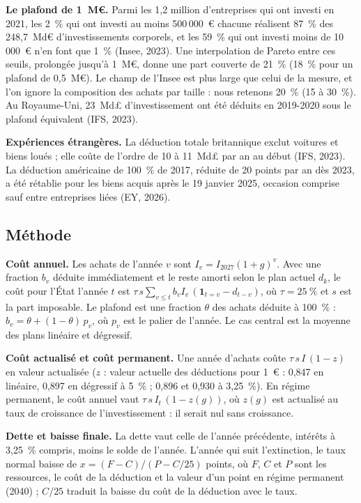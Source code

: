 
\textbf{Le plafond de 1~M€.} Parmi les 1,2 million d'entreprises qui ont investi en 2021, les 2~\% qui ont investi au
moins 500\,000~€ chacune réalisent 87~\% des 248,7~Md€ d'investissements corporels, et les 59~\% qui ont investi moins
de 10\,000~€ n'en font que 1~\% (Insee, 2023). Une interpolation de Pareto entre ces seuils, prolongée jusqu'à 1~M€,
donne une part couverte de 21~\% (18~\% pour un plafond de 0,5~M€). Le champ de l'Insee est plus large que celui de la
mesure, et l'on ignore la composition des achats par taille : nous retenons 20~\% (15 à 30~\%). Au
Royaume-Uni, 23~Md£ d'investissement ont été déduits en 2019-2020 sous le plafond équivalent (IFS, 2023).

\textbf{Expériences étrangères.} La déduction totale britannique exclut voitures et biens loués ; elle coûte de
l'ordre de 10 à 11~Md£ par an au début (IFS, 2023). La déduction américaine de 100~\% de 2017, réduite de
20 points par an dès 2023, a été rétablie pour les biens acquis après le 19 janvier 2025, occasion comprise sauf entre
entreprises liées (EY, 2026).

\subsection{Méthode}\label{ann:is_methode}

\textbf{Coût annuel.} Les achats de l'année $v$ sont $I_v = I_{2027}(1+g)^{v}$. Avec une fraction $b_v$ déduite
immédiatement et le reste amorti selon le plan actuel $d_k$, le coût pour l'État l'année $t$ est
$\tau\, s \sum_{v \le t} b_v I_v\,(\mathbf{1}_{t=v} - d_{t-v})$, où $\tau = 25~\%$ et $s$ est la part imposable. Le
plafond est une fraction $\theta$ des achats déduite à 100~\% : $b_v = \theta + (1-\theta)\,p_v$, où $p_v$ est le
palier de l'année. Le cas central est la moyenne des plans linéaire et dégressif.

\textbf{Coût actualisé et coût permanent.} Une année d'achats coûte $\tau\, s\, I\,(1 - z)$ en valeur actualisée ($z$ :
valeur actuelle des déductions pour 1~€ : 0,847 en linéaire, 0,897 en dégressif à 5~\% ; 0,896 et 0,930 à
3,25~\%). En régime permanent, le coût annuel vaut $\tau\, s\, I_t\,(1 - z(g))$, où $z(g)$ est actualisé au taux de
croissance de l'investissement : il serait nul sans croissance.

\textbf{Dette et baisse finale.} La dette vaut celle de l'année précédente, intérêts à 3,25~\% compris, moins le solde
de l'année. L'année qui suit l'extinction, le taux normal baisse de $x = (F - C)/(P - C/25)$ points, où $F$, $C$ et $P$
sont les ressources, le coût de la déduction et la valeur d'un point en régime permanent (2040) ; $C/25$ traduit la
baisse du coût de la déduction avec le taux.

